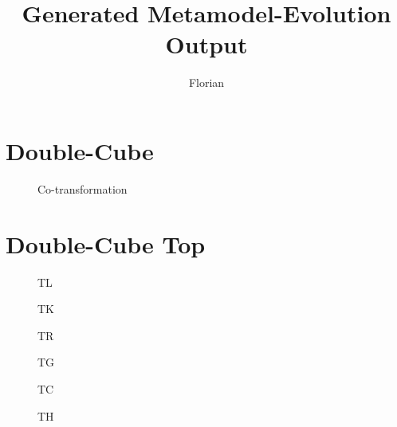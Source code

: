 \documentclass[a4paper,10pt]{article}
\title{Generated Metamodel-Evolution Output}
\author{Florian}
\begin{document}
\maketitle

\begin{landscape}

\section{Double-Cube}

\begin{figure} [htb]
    \begin{center}
    
    \end{center}
      \vspace*{-1cm}
    \caption{Co-transformation}
    \label{fig:co-transformation}
\end{figure}

\section{Double-Cube Top}
\begin{figure}[ht]
\begin{minipage}[b]{0.33\linewidth}
\centering
   \fbox{\texttt{[image: TL]}}
\caption{TL}
\label{fig:figure1}
\end{minipage}
\hspace{0.5cm}
\begin{minipage}[b]{0.33\linewidth}
\centering
   \fbox{\texttt{[image: TK]}}
\caption{TK}
\label{fig:figure2}
\end{minipage}
\begin{minipage}[b]{0.33\linewidth}
\centering
   \fbox{\texttt{[image: TR]}}
\caption{TR}
\label{fig:figure1}
\end{minipage}
\begin{minipage}[b]{0.33\linewidth}
\centering
   \fbox{\texttt{[image: TG]}}
\caption{TG}
\label{fig:figure1}
\end{minipage}
\hspace{0.5cm}
\begin{minipage}[b]{0.33\linewidth}
\centering
   \fbox{\texttt{[image: TC]}}
\caption{TC}
\label{fig:figure2}
\end{minipage}
\begin{minipage}[b]{0.33\linewidth}
\centering
   \fbox{\texttt{[image: TH]}}
\caption{TH}
\label{fig:figure1}
\end{minipage}
\end{figure}



\end{landscape}
\end{document}
